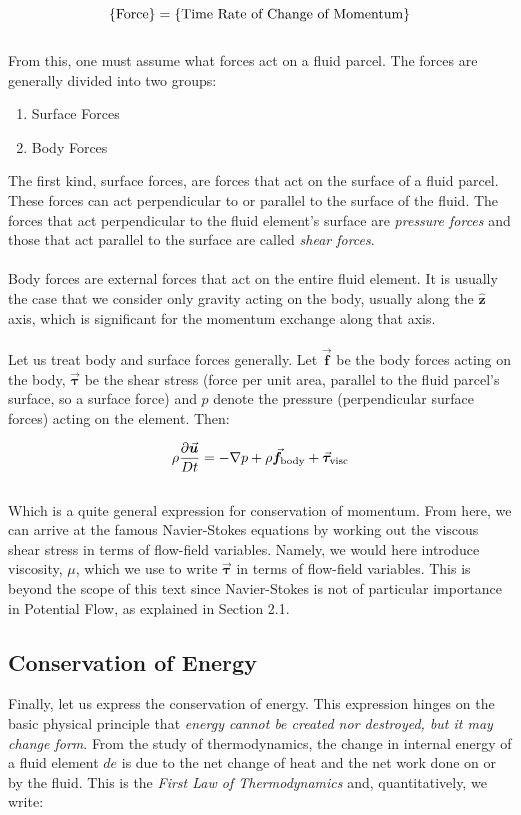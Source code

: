 \documentclass[11pt]{article}
\begin{document}
\begin{equation*}
    \{\textnormal{Force}\} = \{\textnormal{Time Rate of Change of Momentum}\}
\end{equation*}\\
\noindent
From this, one must assume what forces act on a fluid parcel. The forces are generally divided into two groups:

\begin{enumerate}
    \item Surface Forces
    \item Body Forces
\end{enumerate}
\noindent
The first kind, surface forces, are forces that act on the surface of a fluid parcel. These forces can act perpendicular to or parallel to the surface of the fluid. The forces that act perpendicular to the fluid element's surface are \emph{pressure forces} and those that act parallel to the surface are called \emph{shear forces}.\\ \\
\noindent
Body forces are external forces that act on the entire fluid element. It is usually the case that we consider only gravity acting on the body, usually along the $\bm{\hat{z}}$ axis, which is significant for the momentum exchange along that axis.\\ \\
\noindent
Let us treat body and surface forces generally. Let $\vec{\bm{f}}$ be the body forces acting on the body, $\vec{\bm{\tau}}$ be the shear stress (force per unit area, parallel to the fluid parcel's surface, so a surface force) and $p$ denote the pressure (perpendicular surface forces) acting on the element. Then:

\begin{equation}\label{momentum}
    \rho \frac{\partial\vec{\bm{u}}}{Dt} = -\nabla p + \rho \vec{\bm{f}}_{\textnormal{body}} + \vec{\bm{\tau}}_{\textnormal{visc}}
\end{equation} \\
\noindent
Which is a quite general expression for conservation of momentum. From here, we can arrive at the famous Navier-Stokes equations by working out the viscous shear stress in terms of flow-field variables. Namely, we would here introduce viscosity, $\mu$, which we use to write $\vec{\bm{\tau}}$ in terms of flow-field variables. This is beyond the scope of this text since Navier-Stokes is not of particular importance in Potential Flow, as explained in Section 2.1.

\subsection{Conservation of Energy}
Finally, let us express the conservation of energy. This expression hinges on the basic physical principle that \emph{energy cannot be created nor destroyed, but it may change form}. From the study of thermodynamics, the change in internal energy of a fluid element $de$ is due to the net change of heat and the net work done on or by the fluid. This is the \emph{First Law of Thermodynamics} and, quantitatively, we write:
\end{document}
